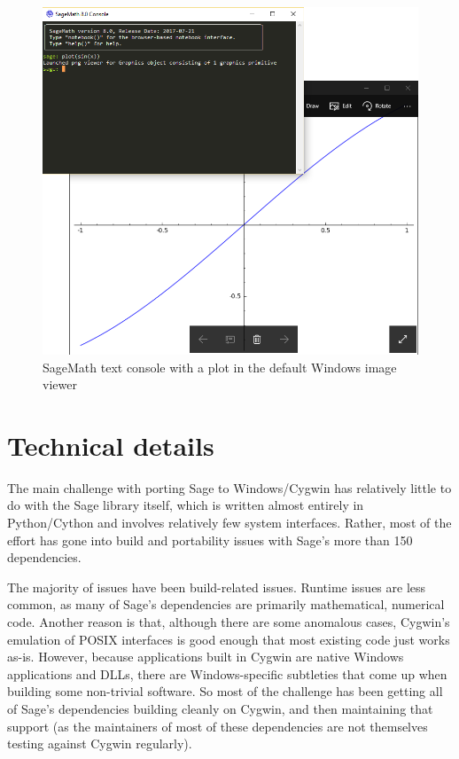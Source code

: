 \begin{figure}[h!]
    \centering
    \includegraphics[width=\textwidth]{screenshots/console}
    \caption{SageMath text console with a plot in the default Windows image viewer}
    \label{fig:console}
\end{figure}

\section{Technical details}

The main challenge with porting Sage to Windows/Cygwin has relatively
little to do with the Sage library itself, which is written almost
entirely in Python/Cython and involves relatively few system interfaces.
Rather, most of the effort has gone into build and portability issues
with Sage's more than 150 dependencies.

The majority of issues have been build-related issues. Runtime issues
are less common, as many of Sage's dependencies are primarily
mathematical, numerical code. Another reason is that, although there are
some anomalous cases, Cygwin's emulation of POSIX interfaces is good
enough that most existing code just works as-is. However, because
applications built in Cygwin are native Windows applications and DLLs,
there are Windows-specific subtleties that come up when building some
non-trivial software. So most of the challenge has been getting all of
Sage's dependencies building cleanly on Cygwin, and then maintaining
that support (as the maintainers of most of these dependencies are not
themselves testing against Cygwin regularly).

